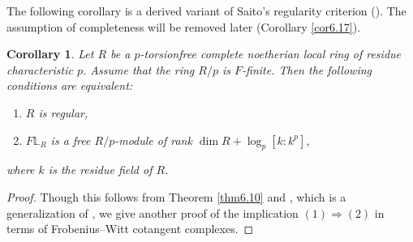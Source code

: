 \documentclass[11pt, a4paper]{amsart}
\theoremstyle{plain}
\newtheorem{coro}[theorem]{Corollary}
\theoremstyle{definition}
\begin{document}
The following corollary is a derived variant of Saito's regularity criterion (\cite[Theorem 3.4]{Sai22}). The assumption of completeness will be removed later (Corollary \ref{cor6.17}).
\begin{coro}\label{cor6.12}
Let $R$ be a $p$-torsionfree complete noetherian local ring of residue characteristic $p$. Assume that the ring $R/p$ is $F$-finite. Then the following conditions are equivalent:\begin{enumerate}
        \item $R$ is regular,
        \item $F\mathbb L_R$ is a free $R/p$-module of rank $\operatorname{dim}R+\operatorname{log}_p[k:k^p]$,
    \end{enumerate}
    where $k$ is the residue field of $R$.
\end{coro}
\begin{proof}
    Though this follows from Theorem \ref{thm6.10} and \cite[Theorem 4.5]{Tak26}, which is a generalization of \cite[Theorem 3.4]{Sai22}, we give another proof of the implication $(1)\Rightarrow (2)$ in terms of Frobenius--Witt cotangent complexes.


\end{proof}
\end{document}
